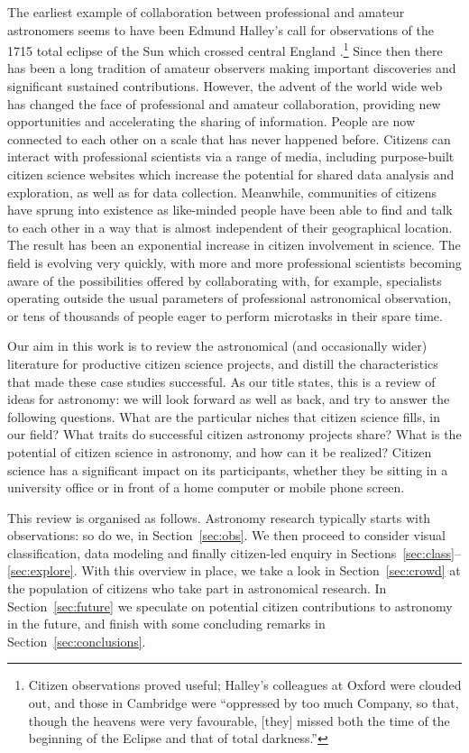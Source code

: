 \documentclass{ar2e}
\def\Sref#1{Section~\ref{#1}\xspace}
\begin{document}
The earliest
example of collaboration between professional and amateur astronomers seems to
have been Edmund Halley's call for observations of the 1715 total eclipse of the
Sun which crossed central England \citep{Halley}.\footnote{Citizen observations proved useful; Halley's colleagues at
Oxford were clouded out, and those in Cambridge were ``oppressed by too much
Company, so that, though the heavens were very favourable, [they] missed both
the time of the beginning of the Eclipse and that of total darkness.''}  Since
then there has been a long tradition of amateur observers
making important discoveries and significant sustained contributions. However,
the advent of the world wide web has changed the face of professional and
amateur collaboration, providing new opportunities and accelerating the sharing
of information. People are now connected to each other on a scale that has never
happened before. Citizens can interact with professional scientists via a range
of media, including purpose-built citizen science websites which
increase the potential for shared data analysis and exploration, as well as for
data collection. Meanwhile, communities of citizens have sprung into existence
as like-minded people have been able to find and talk to each other in a way
that is almost independent of their geographical location. The result has been
an exponential increase in citizen involvement in science. The field is evolving
very quickly, with more and more professional scientists becoming aware of the
possibilities offered by collaborating with, for example, specialists operating
outside the usual parameters of professional astronomical observation, or tens
of thousands of people eager to perform microtasks in their spare time.  

Our aim in this work is to review the astronomical (and occasionally wider)
literature for productive citizen science projects, and distill the
characteristics that made these case studies successful.  As our title states,
this is a review of ideas for astronomy: we will look forward as well as back,
and try to answer the following questions. What are the particular niches that
citizen science fills, in our field? What traits do successful citizen astronomy
projects share? What is the potential of citizen science in
astronomy, and how can it be realized?  Citizen science has a significant impact
on its participants,  whether they be sitting in a university office or in front
of a home computer or mobile phone screen. 

This review is organised as follows. Astronomy research typically starts with
observations: so do we, in \Sref{sec:obs}. We then proceed to consider visual
classification, data modeling and finally citizen-led enquiry in 
Sections~\ref{sec:class}--\ref{sec:explore}. With this overview in place, we
take a look in \Sref{sec:crowd} at the population of citizens who take part in
astronomical research. 
In \Sref{sec:future} we speculate on potential citizen contributions to
astronomy in the future, and finish with some
concluding remarks in \Sref{sec:conclusions}.
\end{document}
